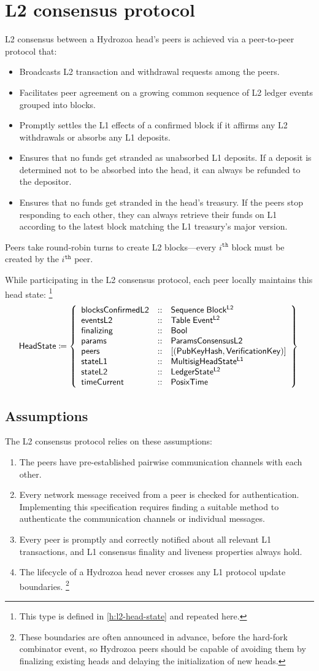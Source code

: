 \documentclass[../hydrozoa.tex]{subfiles}
\begin{document}
\chapter{L2 consensus protocol}%
\label{h:l2-consensus-protocol}%

L2 consensus between a Hydrozoa head's peers is achieved via a peer-to-peer protocol that:
\begin{itemize}
  \item Broadcasts L2 transaction and withdrawal requests among the peers.
  \item Facilitates peer agreement on a growing common sequence of L2 ledger events grouped into blocks.
  \item Promptly settles the L1 effects of a confirmed block if it affirms any L2 withdrawals or absorbs any L1 deposits.
  \item Ensures that no funds get stranded as unabsorbed L1 deposits.
  If a deposit is determined not to be absorbed into the head, it can always be refunded to the depositor.
  \item Ensures that no funds get stranded in the head's treasury.
  If the peers stop responding to each other, they can always retrieve their funds on L1 according to the latest block matching the L1 treasury's major version.
\end{itemize}

Peers take round-robin turns to create L2 blocks---every $i^\mathtt{th}$ block must be created by the  $i^\mathtt{th}$ peer.

While participating in the L2 consensus protocol, each peer locally maintains this head state:%
\footnote{This type is defined in \cref{h:l2-head-state} and repeated here.}
\begin{equation*}
  \headStateTypeName{} \coloneq \headStateTypeBody{}
\end{equation*}

\section{Assumptions}%
\label{h:l2-consensus-assumptions}%

The L2 consensus protocol relies on these assumptions:
\begin{enumerate}
  \item The peers have pre-established pairwise communication channels with each other.
  \item Every network message received from a peer is checked for authentication.
    Implementing this specification requires finding a suitable method to authenticate the communication channels or individual messages.
  \item Every peer is promptly and correctly notified about all relevant L1 transactions, and L1 consensus finality and liveness properties always hold.
  \item The lifecycle of a Hydrozoa head never crosses any L1 protocol update boundaries.%
    \footnote{These boundaries are often announced in advance, before the hard-fork combinator event, so Hydrozoa peers should be capable of avoiding them by finalizing existing heads and delaying the initialization of new heads.}
\end{enumerate}
\end{document}
